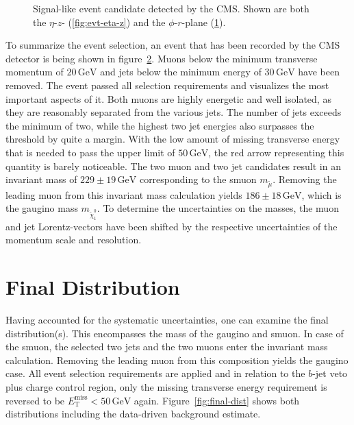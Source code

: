 \begin{figure}[!htbp]
\begin{subfigure}[b]{0.75\textwidth}
    \caption{\label{fig:evt-phi-r}}
  \end{subfigure}
  \caption{Signal-like event candidate detected by the CMS. Shown are both the $\eta$-$z$- (\ref{fig:evt-eta-z}) and the $\phi$-$r$-plane (\ref{fig:evt-phi-r}).}
  \label{fig:evt-display}
\end{figure}

\noindent To summarize the event selection, an event that has been recorded by the CMS detector is being shown in figure~\ref{fig:evt-display}. Muons below the minimum transverse momentum of $20\,\text{GeV}$ and jets below the minimum energy of $30\,\text{GeV}$ have been removed. The event passed all selection requirements and visualizes the most important aspects of it. Both muons are highly energetic and well isolated, as they are reasonably separated from the various jets. The number of jets exceeds the minimum of two, while the highest two jet energies also surpasses the threshold by quite a margin. With the low amount of missing transverse energy that is needed to pass the upper limit of $50\,\text{GeV}$, the red arrow representing this quantity is barely noticeable. The two muon and two jet candidates result in an invariant mass of $229 \pm 19\,\text{GeV}$ corresponding to the smuon $m_{\tilde{\mu}}$. Removing the leading muon from this invariant mass calculation yields $186 \pm 18\,\text{GeV}$, which is the gaugino mass $m_{\tilde{\chi}^0_1}$. To determine the uncertainties on the masses, the muon and jet Lorentz-vectors have been shifted by the respective uncertainties of the momentum scale and resolution.

\section{Final Distribution}
\label{sec:final-dist}

Having accounted for the systematic uncertainties, one can examine the final distribution(s). This encompasses the mass of the gaugino and smuon. In case of the smuon, the selected two jets and the two muons enter the invariant mass calculation. Removing the leading muon from this composition yields the gaugino case. All event selection requirements are applied and in relation to the $b$-jet veto plus charge control region, only the missing transverse energy requirement is reversed to be $E_{\text{T}}^{\text{miss}} < 50\,\text{GeV}$ again. Figure~\ref{fig:final-dist} shows both distributions including the data-driven background estimate.

